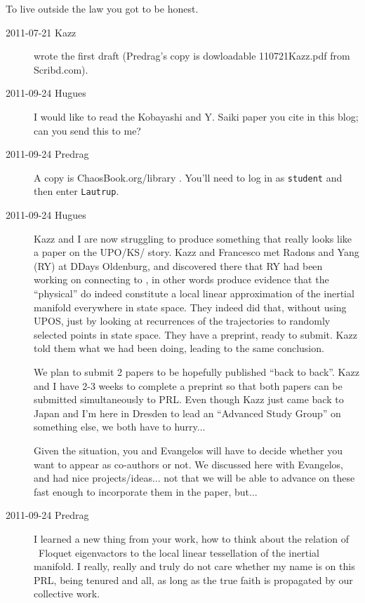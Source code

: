 \begin{bartlett}
To live outside the law   %
you got to be honest.
\end{bartlett}

\begin{description}
\item[2011-07-21 Kazz] wrote the first draft (Predrag's
copy is dowloadable
{110721Kazz.pdf} from Scribd.com).

\item[2011-09-24 Hugues]
I would like to read the  Kobayashi and Y. Saiki paper you
cite in this blog; can you send this to me?

\item[2011-09-24 Predrag]
A copy is ChaosBook.org/library
.
You'll need to log in as \texttt{student} and then enter \texttt{Lautrup}.

\item[2011-09-24 Hugues]
Kazz and I are now struggling to produce something that really looks like
a paper on the UPO/KS/{\cLvs} story. Kazz and Francesco met Radons and Yang
(RY) at DDays Oldenburg, and discovered there that RY had been working on
connecting {\cLvs} to \statesp, in other words produce evidence that the
``physical'' {\cLvs} do indeed constitute a local linear
approximation of the inertial manifold everywhere in state space. They
indeed did that, without using UPOS, just by looking at recurrences of
the trajectories to randomly selected points in state space. They have a
preprint, ready to submit. Kazz told them what we had been doing, leading
to the same conclusion.

We plan to submit 2 papers to be hopefully published ``back to back''.
Kazz and I have 2-3 weeks to complete a preprint so that both papers can
be submitted simultaneously to PRL. Even though Kazz just came back to
Japan and I'm here in Dresden to lead an ``Advanced Study Group'' on
something else, we both have to hurry...

Given the situation, you  and Evangelos  will have to decide
whether you want to appear as co-authors or not. We discussed
here with Evangelos, and had nice projects/ideas... not that we will be
able to advance on these fast enough to incorporate them in the paper,
but...

\item[2011-09-24 Predrag]
I learned a new thing from your work, how to think about the relation of
\po\ Floquet eigenvactors to the local linear tessellation of the
inertial manifold.
I really, really and truly do not care whether my name is on this PRL,
being tenured and all, as long as the true faith is propagated by our
collective work.


\end{description}
